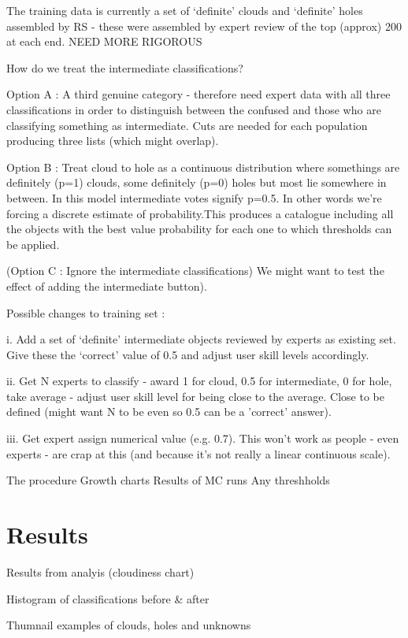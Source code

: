 \documentclass[a4,useAMS,usenatbib]{mn2e}
\begin{document}
The training data is currently a set of `definite' clouds and `definite' holes assembled by RS - these were assembled by expert review of the top (approx) 200 at each end. NEED MORE RIGOROUS

How do we treat the intermediate classifications? 

	Option A : A third genuine category - therefore need expert data with all three classifications in order to distinguish between the confused and those who are classifying something as intermediate. Cuts are needed for each population producing three lists (which might overlap). 
	
	Option B : Treat cloud to hole as a continuous distribution where somethings are definitely (p=1) clouds, some definitely (p=0) holes but most lie somewhere in between. In this model intermediate votes signify p=0.5. In other words we're forcing a discrete estimate of probability.This produces a catalogue including all the objects with the best value probability for each one to which thresholds can be applied. 
	
	(Option C : Ignore the intermediate classifications) We might want to test the effect of adding the intermediate button). 
	
	Possible changes to training set :
	
		i. Add a set of `definite' intermediate objects reviewed by experts as existing set. Give these the `correct' value of 0.5 and adjust user skill levels accordingly.
		
		ii. Get N experts to classify - award 1 for cloud, 0.5 for intermediate, 0 for hole, take average - adjust user skill level for being close to the average. Close to be defined (might want N to be even so 0.5 can be a 'correct' answer). 
		
		iii. Get expert assign numerical value (e.g. 0.7). This won't work as people - even experts - are crap at this (and because it's not really a linear continuous scale). 
		
		
	

The procedure
Growth charts
Results of MC runs
Any threshholds


\section{Results}
Results from analyis (cloudiness chart)

Histogram of classifications before \& after

Thumnail examples of clouds, holes and unknowns
\end{document}
